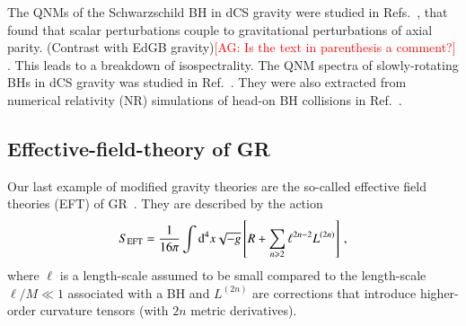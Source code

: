 \documentclass[twocolumn,
               prd,
               aps,
               superscriptaddress,
               tightenlines,
               nofootinbib,
               eqsecnum,
               amsfonts,
               amsmath,
               longbibliography]{revtex4-1}
\newcommand{\dd}{{\rm d}}
\newcommand{\agcomm}[1]{{\textcolor{red}{{[AG: #1]}} }}
\begin{document}
The QNMs of the Schwarzschild BH in dCS gravity were studied in
Refs.~\cite{Yunes:2007ss,Cardoso:2009pk,Molina:2010fb}, that found that scalar
perturbations couple to gravitational perturbations of axial parity. (Contrast
with EdGB gravity)\agcomm{Is the text in parenthesis a comment?}.
%
This leads to a breakdown of isospectrality. The QNM spectra of slowly-rotating BHs in dCS gravity was
studied in Ref.~\cite{Wagle:2021tam}.
%
They were also extracted from numerical relativity (NR) simulations of head-on BH collisions
in Ref.~\cite{Okounkova:2019dfo}.

\subsection{Effective-field-theory of GR}

Our last example of modified gravity theories are the so-called effective field
theories (EFT) of GR~\cite{Endlich:2017tqa,Sennett:2019bpc,deRham:2020ejn,Cano:2020cao,Cano:2021myl}.
%
They are described by the action
%
\begin{equation} \label{eq:action_eft}
    S_{\rm EFT} = \frac{1}{16 \pi}
    \int \dd^4x \sqrt{-g}
    \left[ R
    +
    \sum_{n \geqslant 2} \ell^{2n - 2} L^{(2n)}
    \right]\,,
\end{equation}
%
where $\ell$ is a length-scale assumed to be small compared to the length-scale
$\ell / M \ll 1$ associated with a BH and $L^{(2n)}$ are corrections 
that introduce higher-order curvature tensors (with $2n$ metric derivatives).
\end{document}
